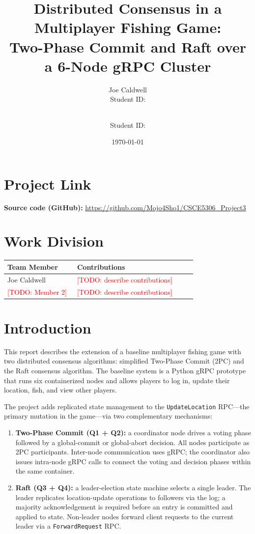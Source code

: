 \documentclass[11pt]{article}
\title{\textbf{Distributed Consensus in a Multiplayer Fishing Game:\\
Two-Phase Commit and Raft over a 6-Node gRPC Cluster}}
\author{
  Joe Caldwell\\
  \small Student ID: \todo{insert student ID}
  \and
  \todo{Team Member 2 Name}\\
  \small Student ID: \todo{insert student ID}
}
\date{\today}
\newcommand{\todo}[1]{\textcolor{red}{[TODO: #1]}}
\newcommand{\rpc}[1]{\texttt{#1}}
\begin{document}
\maketitle

\section*{Project Link}
\textbf{Source code (GitHub):}
\url{https://github.com/Mojo4Sho1/CSCE5306_Project3}

\section*{Work Division}
\begin{tabular}{p{0.35\linewidth} p{0.60\linewidth}}
\toprule
\textbf{Team Member} & \textbf{Contributions} \\
\midrule
Joe Caldwell & \todo{describe contributions} \\
\todo{Member 2} & \todo{describe contributions} \\
\bottomrule
\end{tabular}

\section{Introduction}
This report describes the extension of a baseline multiplayer fishing game with two distributed
consensus algorithms: simplified Two-Phase Commit (2PC) and the Raft consensus algorithm.
The baseline system is a Python gRPC prototype that runs six containerized nodes
and allows players to log in, update their location, fish, and view other players.

The project adds replicated state management to the \rpc{UpdateLocation} RPC---the primary
mutation in the game---via two complementary mechanisms:
\begin{enumerate}[label=(\alph*)]
  \item \textbf{Two-Phase Commit (Q1 + Q2):} a coordinator node drives a voting phase
    followed by a global-commit or global-abort decision.  All nodes participate as
    2PC participants.  Inter-node communication uses gRPC; the coordinator also issues
    intra-node gRPC calls to connect the voting and decision phases within the same container.
  \item \textbf{Raft (Q3 + Q4):} a leader-election state machine selects a single leader.
    The leader replicates location-update operations to followers via the log;
    a majority acknowledgement is required before an entry is committed and applied to state.
    Non-leader nodes forward client requests to the current leader via a \rpc{ForwardRequest} RPC.
\end{enumerate}
\end{document}

